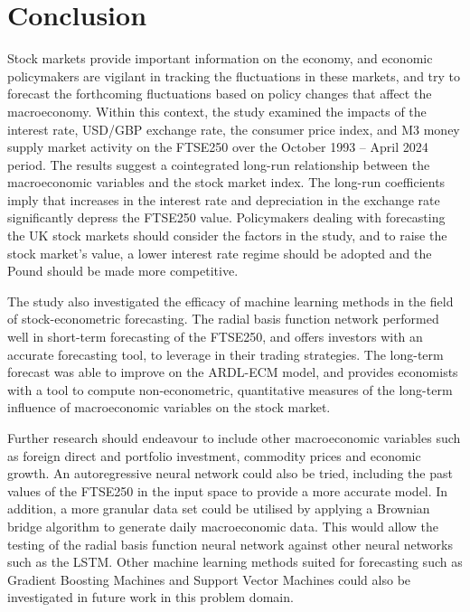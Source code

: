 \documentclass[11pt,a4paper]{article}
\begin{document}
\section{Conclusion}

Stock markets provide important information on the economy, 
and economic policymakers are vigilant in tracking the fluctuations 
in these markets, and try to forecast the 
forthcoming fluctuations based on policy changes that affect the macroeconomy.
Within this context, the study examined the 
impacts of the interest rate, USD/GBP
exchange rate, the consumer price index, and 
M3 money supply market activity on
the FTSE250 over the October 1993 – April 2024 period.
The results suggest a cointegrated long-run
relationship between the macroeconomic variables and the stock market index. 
The long-run coefficients imply that
increases in the interest rate and depreciation in the exchange rate
significantly depress the FTSE250 value. 
Policymakers dealing with forecasting the UK stock markets
should consider the factors in the study, and to raise the stock
market's value, a lower interest rate regime should be adopted and 
the Pound should be made more competitive.

The study also investigated the efficacy of machine learning methods in 
the field of stock-econometric forecasting. The radial basis function network performed well in
short-term forecasting of the FTSE250, and offers investors with an accurate forecasting tool, 
to leverage in their trading strategies. The long-term forecast was able to improve on the ARDL-ECM model, and provides 
economists with a tool to compute non-econometric, quantitative measures of the 
long-term influence of macroeconomic variables on the stock market. 

Further research should endeavour to include other macroeconomic variables such as 
foreign direct and portfolio investment, commodity prices and economic growth.
An autoregressive neural network could also be tried, including the past values of the 
FTSE250 in the input space to provide a more accurate model. In addition, 
a more granular data set could be utilised by applying a 
Brownian bridge algorithm to generate daily macroeconomic data. This would allow 
the testing of the radial basis function neural network against other neural networks 
such as the LSTM. Other machine learning methods suited for 
forecasting such as Gradient Boosting Machines and Support Vector Machines could 
also be investigated in future work in this problem domain. 



\end{document}
